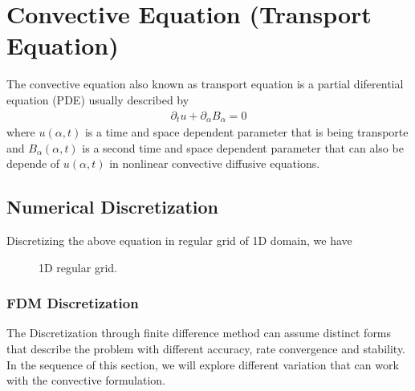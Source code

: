 \documentclass[letterpaper,10pt,english,openany,oneside]{jupyterBook}
\begin{document}
\chapter{Convective Equation (Transport Equation)}
\label{\detokenize{LBM-Study/Convective-Equation:convective-equation-transport-equation}}\label{\detokenize{LBM-Study/Convective-Equation::doc}}
\sphinxAtStartPar
The convective equation also known as transport equation is a partial diferential equation (PDE) usually described by
\begin{equation}\label{equation:LBM-Study/Convective-Equation:cv-eq-lb}
\begin{split}
\partial_t u + \partial_{\alpha}B_{\alpha}  = 0
\end{split}
\end{equation}
\sphinxAtStartPar
where \(u(\alpha,t)\) is a time and space dependent parameter that is being transporte and \(B_{\alpha}(\alpha,t)\) is a second time and space dependent parameter that can also be depende of \(u(\alpha,t)\) in non\sphinxhyphen{}linear convective diffusive equations.


\section{Numerical Discretization}
\label{\detokenize{LBM-Study/Convective-Equation:numerical-discretization}}
\sphinxAtStartPar
Discretizing the above equation in regular grid of 1D domain, we have

\begin{figure}[htbp]
\centering
\capstart

\noindent{}
\caption{1D regular grid.}\label{\detokenize{LBM-Study/Convective-Equation:mesh-1-convective}}\end{figure}


\subsection{FDM Discretization}
\label{\detokenize{LBM-Study/Convective-Equation:fdm-discretization}}
\sphinxAtStartPar
The Discretization through finite difference method can assume distinct forms that describe the problem with different accuracy, rate convergence and stability. In the sequence of this section, we will explore different variation that can work with the convective formulation.
\end{document}
